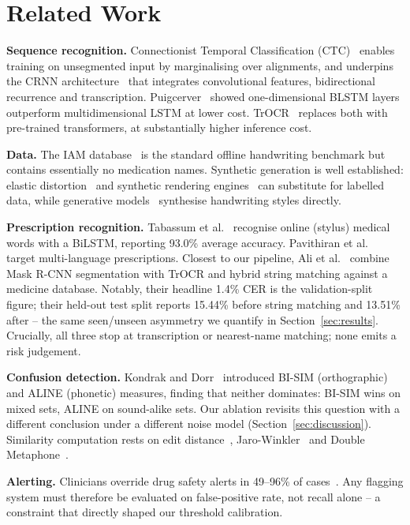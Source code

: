 \documentclass[conference]{IEEEtran}
\begin{document}
\section{Related Work}
\textbf{Sequence recognition.} Connectionist Temporal Classification
(CTC)~\cite{graves2006ctc} enables training on unsegmented input by marginalising
over alignments, and underpins the CRNN architecture~\cite{shi2017crnn} that
integrates convolutional features, bidirectional recurrence and transcription.
Puigcerver~\cite{puigcerver2017mdlstm} showed one-dimensional BLSTM layers
outperform multidimensional LSTM at lower cost. TrOCR~\cite{li2023trocr}
replaces both with pre-trained transformers, at substantially higher inference
cost.

\textbf{Data.} The IAM database~\cite{marti2002iam} is the standard offline
handwriting benchmark but contains essentially no medication names. Synthetic
generation is well established: elastic distortion~\cite{simard2003elastic} and
synthetic rendering engines~\cite{jaderberg2014synthetic} can substitute for
labelled data, while generative models~\cite{fogel2020scrabblegan} synthesise
handwriting styles directly.

\textbf{Prescription recognition.} Tabassum et al.~\cite{tabassum2022online}
recognise online (stylus) medical words with a BiLSTM, reporting 93.0\% average
accuracy. Pavithiran et al.~\cite{pavithiran2022multilang} target multi-language
prescriptions. Closest to our pipeline, Ali et al.~\cite{ali2024multihead}
combine Mask R-CNN segmentation with TrOCR and hybrid string matching against a
medicine database. Notably, their headline 1.4\% CER is the validation-split
figure; their held-out test split reports 15.44\% before string matching and
13.51\% after -- the same seen/unseen asymmetry we quantify in
Section~\ref{sec:results}. Crucially, all three stop at transcription or
nearest-name matching; none emits a risk judgement.

\textbf{Confusion detection.} Kondrak and Dorr~\cite{kondrak2004identification,
kondrak2006confusable} introduced BI-SIM (orthographic) and ALINE (phonetic)
measures, finding that neither dominates: BI-SIM wins on mixed sets, ALINE on
sound-alike sets. Our ablation revisits this question with a different
conclusion under a different noise model (Section~\ref{sec:discussion}).
Similarity computation rests on edit distance~\cite{levenshtein1966binary},
Jaro-Winkler~\cite{winkler1990string} and Double
Metaphone~\cite{philips2000metaphone}.

\textbf{Alerting.} Clinicians override drug safety alerts in 49--96\% of
cases~\cite{vandersijs2006override}. Any flagging system must therefore be
evaluated on false-positive rate, not recall alone -- a constraint that directly
shaped our threshold calibration.
\end{document}
